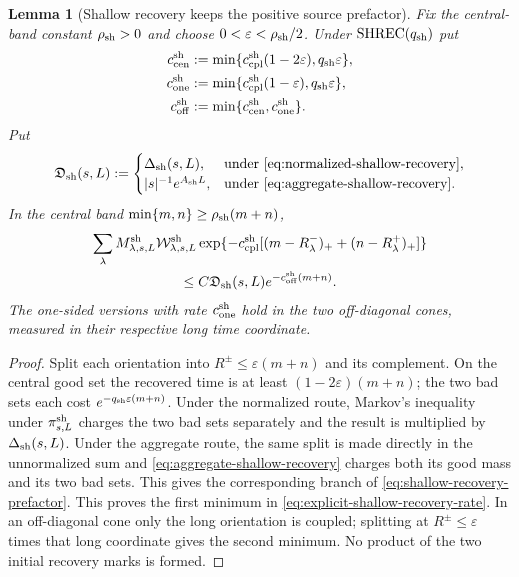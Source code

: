 \documentclass[11pt]{article}
\newtheorem{lemma}[theorem]{Lemma}
\begin{document}
\begin{lemma}[Shallow recovery keeps the positive source prefactor]
\label{lem:normalized-shallow-recovery}
Fix the central-band constant $\rho_{\rm sh}>0$ and choose
$0<\varepsilon<\rho_{\rm sh}/2$.  Under
$\mathrm{SHREC}(q_{\rm sh})$ put
\begin{equation}
\label{eq:explicit-shallow-recovery-rate}
 \begin{aligned}
 c_{\rm cen}^{\rm sh}&:=
 \min\{c_{\rm cpl}^{\rm sh}(1-2\varepsilon),q_{\rm sh}\varepsilon\},\\
 c_{\rm one}^{\rm sh}&:=
 \min\{c_{\rm cpl}^{\rm sh}(1-\varepsilon),q_{\rm sh}\varepsilon\},\\
 c_{\rm off}^{\rm sh}&:=\min\{c_{\rm cen}^{\rm sh},c_{\rm one}^{\rm sh}\}.
 \end{aligned}
\end{equation}
Put
\begin{equation}
\label{eq:shallow-recovery-prefactor}
 \mathfrak D_{\rm sh}(s,L):=
 \begin{cases}
  \Delta_{\rm sh}(s,L),&\text{under
  \eqref{eq:normalized-shallow-recovery}},\\
  |s|^{-1}e^{A_{\rm sh}L},&\text{under
  \eqref{eq:aggregate-shallow-recovery}}.
 \end{cases}
\end{equation}
In the central band $\min\{m,n\}\ge\rho_{\rm sh}(m+n)$,
\begin{multline}
\label{eq:weighted-shallow-delayed-coupling}
 \sum_\lambda M^{\rm sh}_{\lambda,s,L}
 \mathcal W^{\rm sh}_{\lambda,s,L}
 \exp\{-c_{\rm cpl}^{\rm sh}[(m-R^-_\lambda)_+
 +(n-R^+_\lambda)_+]\}\\
 \le C\mathfrak D_{\rm sh}(s,L)
 e^{-c_{\rm off}^{\rm sh}(m+n)} .
\end{multline}
The one-sided versions with rate $c_{\rm one}^{\rm sh}$ hold in the two
off-diagonal cones, measured in their respective long time coordinate.
\end{lemma}

\begin{proof}
Split each orientation into $R^\pm\le\varepsilon(m+n)$ and its complement.
On the central good set the recovered time is at least
$(1-2\varepsilon)(m+n)$; the two bad sets each cost
$e^{-q_{\rm sh}\varepsilon(m+n)}$.  Under the normalized route, Markov's
inequality under $\pi^{\rm sh}_{s,L}$ charges the two bad sets separately
and the result is multiplied by $\Delta_{\rm sh}(s,L)$.  Under the
aggregate route, the same split is made directly in the unnormalized sum
and \eqref{eq:aggregate-shallow-recovery} charges both its good mass and
its two bad sets.  This gives the corresponding branch of
\eqref{eq:shallow-recovery-prefactor}.
This proves the first minimum in
\eqref{eq:explicit-shallow-recovery-rate}.  In an off-diagonal cone only the
long orientation is coupled; splitting at $R^\pm\le\varepsilon$ times that
long coordinate gives the second minimum.  No product of the two initial
recovery marks is formed.
\end{proof}
\end{document}
